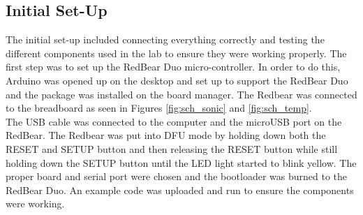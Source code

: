 \documentclass[11pt]{article}
\begin{document}
\subsection{Initial Set-Up}

The initial set-up included connecting everything correctly and testing the different components used in the lab to ensure they were working properly. The first step was to set up the RedBear Duo micro-controller. In order to do this, Arduino was opened up on the desktop and set up to support the RedBear Duo and the package was installed on the board manager. The Redbear was connected to the breadboard as seen in Figures \ref{fig:sch_sonic} and \ref{fig:sch_temp}.\\

The USB cable was connected to the computer and the microUSB port on the RedBear. The Redbear was put into DFU mode by holding down both the RESET and SETUP button and then releasing the RESET button while still holding down the SETUP button until the LED light started to blink yellow. The proper board and serial port were chosen and the bootloader was  burned to the RedBear Duo. An example code was uploaded and run to ensure the components were working.\\
\end{document}
